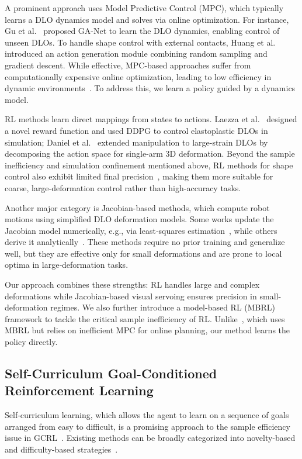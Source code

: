 \documentclass[letterpaper, 10 pt, conference]{ieeeconf}  %
\begin{document}
A prominent approach uses Model Predictive Control (MPC), which typically learns a DLO dynamics model and solves via online optimization. For instance, Gu et al.~\cite{gu2025learning} proposed GA-Net to learn the DLO dynamics, enabling control of unseen DLOs. To handle shape control with external contacts, Huang et al.~\cite{huang2023learning} introduced an action generation module combining random sampling and gradient descent. While effective, MPC-based approaches suffer from computationally expensive online optimization, leading to low efficiency in dynamic environments~\cite{shi2024robocraft}. To address this, we learn a policy guided by a dynamics model.

RL methods learn direct mappings from states to actions. Laezza et al.~\cite{laezza2021learning} designed a novel reward function and used DDPG to control elastoplastic DLOs in simulation; Daniel et al.~\cite{daniel2023multi} extended manipulation to large-strain DLOs by decomposing the action space for single-arm 3D deformation. Beyond the sample inefficiency and simulation confinement mentioned above, RL methods for shape control also exhibit limited final precision~\cite{laezza2024offline}, making them more suitable for coarse, large-deformation control rather than high-accuracy tasks.

Another major category is Jacobian-based methods, which compute robot motions using simplified DLO deformation models. Some works update the Jacobian model numerically, e.g., via least‑squares estimation~\cite{zhu2018dual,jin2019robust}, while others derive it analytically~\cite{almaghout2024robotic}. These methods require no prior training and generalize well, but they are effective only for small deformations and are prone to local optima in large‑deformation tasks.

Our approach combines these strengths: RL handles large and complex deformations while Jacobian-based visual servoing ensures precision in small-deformation regimes. We also further introduce a model-based RL (MBRL) framework to tackle the critical sample inefficiency of RL. Unlike~\cite{yang2022online}, which uses MBRL but relies on inefficient MPC for online planning, our method learns the policy directly.


\subsection{Self-Curriculum Goal-Conditioned Reinforcement Learning}

Self-curriculum learning, which allows the agent to learn on a sequence of goals  arranged from easy to difficult, is a promising approach to the sample efficiency issue in GCRL~\cite{gong2024goal}. Existing methods can be broadly categorized into novelty-based and difficulty-based strategies~\cite{castanet2023stein}.
\end{document}
